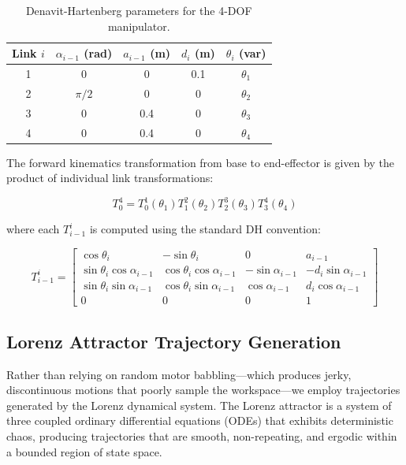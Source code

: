 \documentclass[12pt,a4paper,oneside]{report}
\begin{document}
\begin{table}[H]
\centering
\caption{Denavit-Hartenberg parameters for the 4-DOF manipulator.}
\label{tab:dh_parameters}
\begin{tabular}{ccccc}
\toprule
Link $i$ & $\alpha_{i-1}$ (rad) & $a_{i-1}$ (m) & $d_i$ (m) & $\theta_i$ (var) \\
\midrule
1 & 0 & 0 & 0.1 & $\theta_1$ \\
2 & $\pi/2$ & 0 & 0 & $\theta_2$ \\
3 & 0 & 0.4 & 0 & $\theta_3$ \\
4 & 0 & 0.4 & 0 & $\theta_4$ \\
\bottomrule
\end{tabular}
\end{table}

The forward kinematics transformation from base to end-effector is given by the product of individual link transformations:

\begin{equation}
T_{0}^{4} = T_{0}^{1}(\theta_1) T_{1}^{2}(\theta_2) T_{2}^{3}(\theta_3) T_{3}^{4}(\theta_4)
\end{equation}

where each $T_{i-1}^{i}$ is computed using the standard DH convention:

\begin{equation}
T_{i-1}^{i} = 
\begin{bmatrix}
\cos\theta_i & -\sin\theta_i & 0 & a_{i-1} \\
\sin\theta_i \cos\alpha_{i-1} & \cos\theta_i \cos\alpha_{i-1} & -\sin\alpha_{i-1} & -d_i \sin\alpha_{i-1} \\
\sin\theta_i \sin\alpha_{i-1} & \cos\theta_i \sin\alpha_{i-1} & \cos\alpha_{i-1} & d_i \cos\alpha_{i-1} \\
0 & 0 & 0 & 1
\end{bmatrix}
\end{equation}

\subsection{Lorenz Attractor Trajectory Generation}
\label{subsec:lorenz_attractor_trajectory_generation}

Rather than relying on random motor babbling—which produces jerky, discontinuous motions that poorly sample the workspace—we employ trajectories generated by the Lorenz dynamical system. The Lorenz attractor is a system of three coupled ordinary differential equations (ODEs) that exhibits deterministic chaos, producing trajectories that are smooth, non-repeating, and ergodic within a bounded region of state space.
\end{document}

